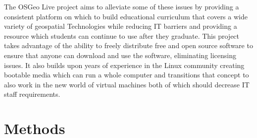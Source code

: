 \documentclass[12pt,letterpaper]{article}
\begin{document}
	The OSGeo Live project aims to alleviate some of these issues by providing a consistent platform on which to build educational curriculum that covers a wide variety of geospatial Technologies while reducing IT barriers and providing a resource which students can continue to use after they graduate. This project takes advantage of the ability to freely distribute free and open source software to ensure that anyone can download and use the software, eliminating licensing issues. It also builds upon years of experience in the Linux community creating bootable media \parencite{Negus2006,Knopper2006} which can run a whole computer and transitions that concept to also work in the new world of virtual machines both of which should decrease IT staff requirements.

%


\section{Methods}
\end{document}

